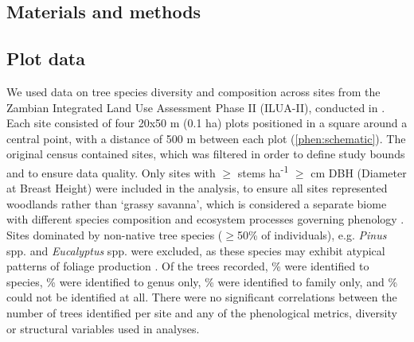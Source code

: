 \begin{refsection}
\section{Materials and methods}
\label{phen:sec:methods}

\subsection{Plot data}
\label{phen:ssec:plots}

We used data on tree species diversity and composition across \nSites{} sites from the Zambian Integrated Land Use Assessment Phase II (ILUA-II), conducted in \censusDate{} \citep{Mukosha2009, Pelletier2018}. Each site consisted of four 20x50 m (0.1 ha) plots positioned in a square around a central point, with a distance of 500 m between each plot (\autoref{phen:schematic}). The original census contained \nTotalSites{} sites, which was filtered in order to define study bounds and to ensure data quality. Only sites with $\geq$\treesHa{} stems ha\textsuperscript{-1} $\geq$\stemSize{} cm DBH (Diameter at Breast Height) were included in the analysis, to ensure all sites represented woodlands rather than `grassy savanna', which is considered a separate biome with different species composition and ecosystem processes governing phenology \citep{Parr2014}. Sites dominated by non-native tree species ($\geq$50\% of individuals), e.g. \textit{Pinus} spp. and \textit{Eucalyptus} spp. were excluded, as these species may exhibit atypical patterns of foliage production \citep{Broadhead2003}. Of the \nTrees{} trees recorded, \perSp{}\% were identified to species, \perGen{}\% were identified to genus only, \perFam{}\% were identified to family only, and \perIndet{}\% could not be identified at all. There were no significant correlations between the number of trees identified per site and any of the phenological metrics, diversity or structural variables used in analyses.


\end{refsection}
